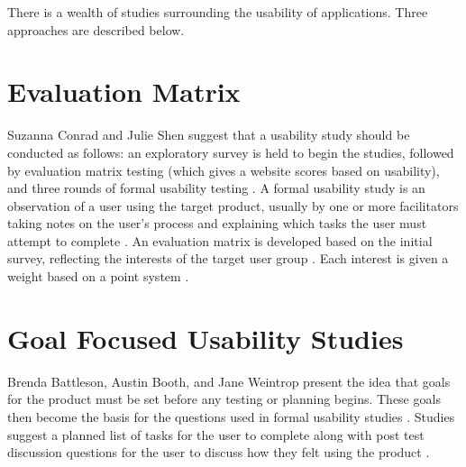 %
%

There is a wealth of studies surrounding the usability of applications. Three approaches are described below.
\section{Evaluation Matrix}
Suzanna Conrad and Julie Shen suggest that a usability study should be conducted as follows: an exploratory survey is held to begin the studies, followed by evaluation matrix testing (which gives a website scores based on usability), and three rounds of formal usability testing \cite{usercen}. A formal usability study is an observation of a user using the target product, usually by one or more facilitators taking notes on the user's process and explaining which tasks the user must attempt to complete \cite{usercen}. An evaluation matrix is developed based on the initial survey, reflecting the interests of the target user group \cite{usercen}. Each interest is given a weight based on a point system \cite{usercen}. 
\section{Goal Focused Usability Studies}
Brenda Battleson, Austin Booth, and Jane Weintrop \cite{casestudy} present the idea that goals for the product must be set before any testing or planning begins. These goals then become the basis for the questions used in formal usability studies \cite{casestudy}. Studies suggest a planned list of tasks for the user to complete along with post test discussion questions for the user to discuss how they felt using the product \cite{casestudy}. 

